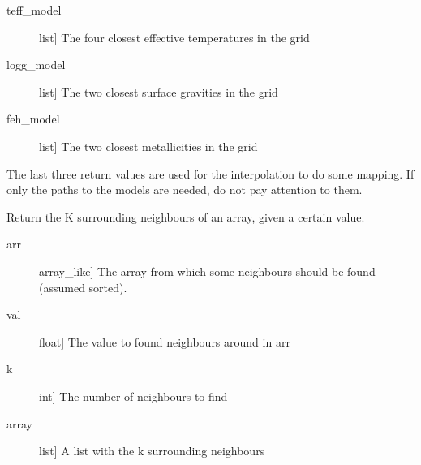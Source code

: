 \documentclass[letterpaper,10pt,english]{sphinxmanual}
\begin{document}
\begin{fulllineitems}
\begin{fulllineitems}
\begin{description}
\item[{teff\_model}] \leavevmode{[}list{]}
The four closest effective temperatures in the grid

\item[{logg\_model}] \leavevmode{[}list{]}
The two closest surface gravities in the grid

\item[{feh\_model}] \leavevmode{[}list{]}
The two closest metallicities in the grid

\end{description}

The last three return values are used for the interpolation to do some
mapping. If only the paths to the models are needed, do not pay attention
to them.

\end{fulllineitems}


\begin{fulllineitems}
\label{\detokenize{index:FASMA.utils.GetModels.neighbour}}
Return the K surrounding neighbours of an array, given a certain value.
\begin{description}
\item[{arr}] \leavevmode{[}array\_like{]}
The array from which some neighbours should be found (assumed sorted).

\item[{val}] \leavevmode{[}float{]}
The value to found neighbours around in arr

\item[{k}] \leavevmode{[}int{]}
The number of neighbours to find

\end{description}
\begin{description}
\item[{array}] \leavevmode{[}list{]}
A list with the k surrounding neighbours

\end{description}

\end{fulllineitems}


\end{fulllineitems}

\end{document}
